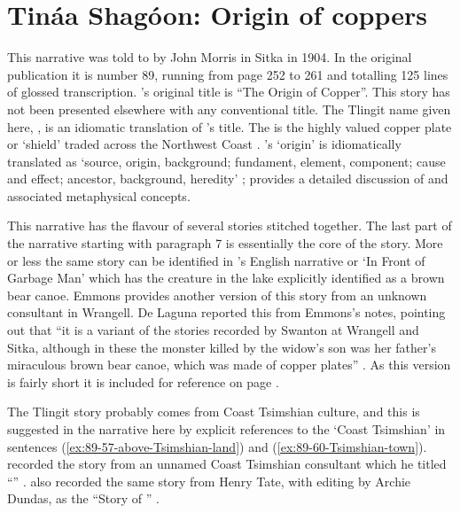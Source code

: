 
\resetexcnt
\chapter{Tináa Shagóon: Origin of coppers}\label{ch:89-origin-of-copper}

This narrative was told to \citeauthor{swanton:1909} by  John Morris in Sitka in 1904.
In the original publication it is number 89, running from page 252 to 261 and totalling 125 lines of glossed transcription.
\citeauthor{swanton:1909}’s original title is “The Origin of Copper”.
This story has not been presented elsewhere with any conventional title.
The Tlingit name given here, , is an idiomatic translation of \citeauthor{swanton:1909}’s title.
The  is the highly valued copper plate or ‘shield’ traded across the Northwest Coast \parencites{keithahn:1964}[353–354]{de-laguna:1972}{jopling:1989}[179–183]{emmons:1991}[237–243]{kan:2016}.
\citeauthor{swanton:1909}’s ‘origin’ is idiomatically translated as  ‘source, origin, background; fundament, element, component; cause and effect; ancestor, background, heredity’ \parencite[\textsc{t}·63]{leer:2001}; \textcite[71 ff.]{kan:2016} provides a detailed discussion of  and associated metaphysical concepts.

This narrative has the flavour of several stories stitched together.
The last part of the narrative starting with paragraph 7 is essentially the core of the  story.
More or less the same story can be identified in ’s English narrative  or  ‘In Front of Garbage Man’ \parencite[132–133]{swanton:1909} which has the creature in the lake explicitly identified as a brown bear canoe.
Emmons provides another version of this story from an unknown consultant in Wrangell. De Laguna reported this from Emmons’s notes, pointing out that “it is a variant of the stories recorded by Swanton at Wrangell and Sitka, although in these the monster killed by the widow’s son was her father’s miraculous brown bear canoe, which was made of copper plates” \parencite[180]{emmons:1991}. As this version is fairly short it is included for reference on page \pageref{sec:89-emmons-version}.

The Tlingit story probably comes from Coast Tsimshian culture, and this is suggested in the narrative here by explicit references to the  ‘Coast Tsimshian’ in sentences (\ref{ex:89-57-above-Tsimshian-land}) and (\ref{ex:89-60-Tsimshian-town}).
\citeauthor{boas:1895} recorded the story from an unnamed Coast Tsimshian consultant which he titled “” \parencite[581–589]{boas:2002}.
\citeauthor{boas:1912a} also recorded the same story from Henry Tate, with editing by Archie Dundas, as the “Story of ” \parencite[147–191]{boas:1912a}.


